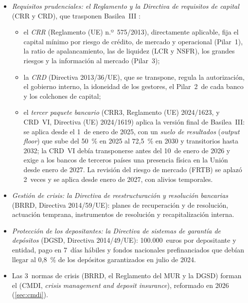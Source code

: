 \documentclass[11pt]{article}
\begin{document}
\begin{itemize}
\item \emph{Requisitos prudenciales: el Reglamento y la Directiva de requisitos de capital} (CRR y CRD), que trasponen Basilea~III :
  \begin{itemize}
  \item el \emph{CRR} (Reglamento (UE) n.º~575/2013), directamente aplicable, fija el capital mínimo por riesgo de crédito, de mercado y operacional (Pilar~1), la ratio de apalancamiento, las de liquidez (LCR y NSFR), los grandes riesgos y la información al mercado (Pilar~3)\nocite{RegUE2013CRR};
  \item la \emph{CRD} (Directiva 2013/36/UE), que se transpone, regula la autorización, el gobierno interno, la idoneidad de los gestores, el Pilar~2~de cada banco y los colchones de capital\nocite{DirUE2013CRD};
  \item el \emph{tercer paquete bancario} (CRR3, Reglamento (UE) 2024/1623, y CRD~VI, Directiva (UE) 2024/1619) aplica la versión final de Basilea~III: se aplica desde el 1~de enero de 2025, con un \emph{suelo de resultados} (\emph{output floor}) que sube del 50~\% en 2025 al 72,5~\% en 2030 y transitorios hasta 2032; la CRD~VI debía transponerse antes del 10~de enero de 2026 y exige a los bancos de terceros países una presencia física en la Unión desde enero de 2027. La revisión del riesgo de mercado (FRTB) se aplazó 2~veces y se aplica desde enero de 2027, con alivios temporales\nocite{RegUE2024CRR3,UE2024CRD6,CE2026FRTB}.
  \end{itemize}
\item \emph{Gestión de crisis: la Directiva de reestructuración y resolución bancarias} (BRRD, Directiva 2014/59/UE): planes de recuperación y de resolución, actuación temprana, instrumentos de resolución y recapitalización interna\nocite{DirUE2014BRRD}.
\item \emph{Protección de los depositantes: la Directiva de sistemas de garantía de depósitos} (DGSD, Directiva 2014/49/UE): 100.000~euros por depositante y entidad, pago en 7~días hábiles y fondos nacionales prefinanciados que debían llegar al 0,8~\% de los depósitos garantizados en julio de 2024\nocite{UE2014DGSD}.
\item Las 3~normas de crisis (BRRD, el Reglamento del MUR y la DGSD) forman el  (CMDI, \emph{crisis management and deposit insurance}), reformado en 2026 (\ref{sec:cmdi}).
\end{itemize}
\end{document}
